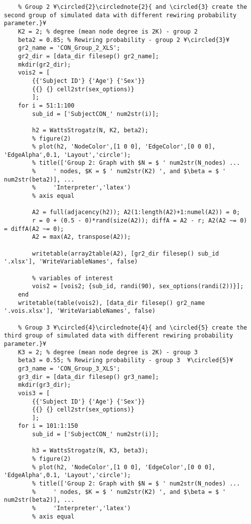 \documentclass{tufte-handout}
\begin{document}
\begin{lstlisting}
    % Group 2 ¥\circled{2}\circlednote{2}{ and \circled{3} create the second group of simulated data with different rewiring probability parameter.}¥
    K2 = 2; % degree (mean node degree is 2K) - group 2
    beta2 = 0.85; % Rewiring probability - group 2 ¥\circled{3}¥
    gr2_name = 'CON_Group_2_XLS';
    gr2_dir = [data_dir filesep() gr2_name];
    mkdir(gr2_dir);
    vois2 = [
        {{'Subject ID'} {'Age'} {'Sex'}}
        {{} {} cell2str(sex_options)}
        ];
    for i = 51:1:100
        sub_id = ['SubjectCON_' num2str(i)];

        h2 = WattsStrogatz(N, K2, beta2);
        % figure(2)
        % plot(h2, 'NodeColor',[1 0 0], 'EdgeColor',[0 0 0], 'EdgeAlpha',0.1, 'Layout','circle');
        % title(['Group 2: Graph with $N = $ ' num2str(N_nodes) ...
        %     ' nodes, $K = $ ' num2str(K2) ', and $\beta = $ ' num2str(beta2)], ...
        %     'Interpreter','latex')
        % axis equal

        A2 = full(adjacency(h2)); A2(1:length(A2)+1:numel(A2)) = 0;
        r = 0 + (0.5 - 0)*rand(size(A2)); diffA = A2 - r; A2(A2 ~= 0) = diffA(A2 ~= 0);
        A2 = max(A2, transpose(A2));

        writetable(array2table(A2), [gr2_dir filesep() sub_id '.xlsx'], 'WriteVariableNames', false)

        % variables of interest
        vois2 = [vois2; {sub_id, randi(90), sex_options(randi(2))}];
    end
    writetable(table(vois2), [data_dir filesep() gr2_name '.vois.xlsx'], 'WriteVariableNames', false)

    % Group 3 ¥\circled{4}\circlednote{4}{ and \circled{5} create the third group of simulated data with different rewiring probability parameter.}¥
    K3 = 2; % degree (mean node degree is 2K) - group 3
    beta3 = 0.55; % Rewiring probability - group 3  ¥\circled{5}¥
    gr3_name = 'CON_Group_3_XLS';
    gr3_dir = [data_dir filesep() gr3_name];
    mkdir(gr3_dir);
    vois3 = [
        {{'Subject ID'} {'Age'} {'Sex'}}
        {{} {} cell2str(sex_options)}
        ];
    for i = 101:1:150
        sub_id = ['SubjectCON_' num2str(i)];

        h3 = WattsStrogatz(N, K3, beta3);
        % figure(2)
        % plot(h2, 'NodeColor',[1 0 0], 'EdgeColor',[0 0 0], 'EdgeAlpha',0.1, 'Layout','circle');
        % title(['Group 2: Graph with $N = $ ' num2str(N_nodes) ...
        %     ' nodes, $K = $ ' num2str(K2) ', and $\beta = $ ' num2str(beta2)], ...
        %     'Interpreter','latex')
        % axis equal


\end{lstlisting}
\end{document}
